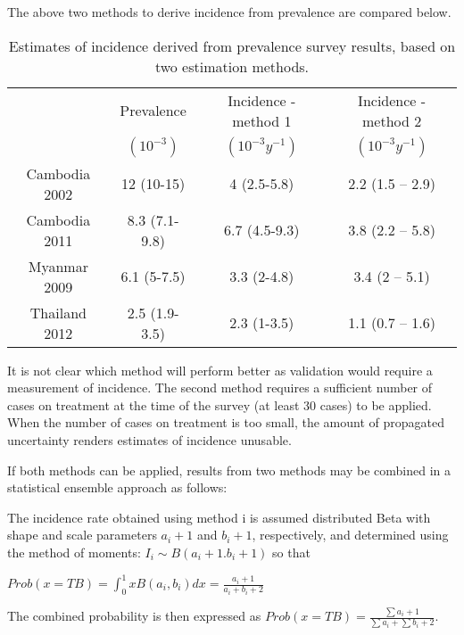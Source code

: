 The above two methods to derive incidence from prevalence are compared below.

\begin{table} 
    \begin{tabular}{ c c c c }
    \hline
         & Prevalence & Incidence - method 1 & Incidence - method 2 \\ 
         & $(10^{-3})$  & $(10^{-3} y^{-1})$     & $(10^{-3} y^{-1})$ \\
    \hline
        Cambodia 2002 & 12 (10-15) & 4 (2.5-5.8) & 2.2 (1.5 – 2.9) \\ 
        Cambodia 2011 & 8.3 (7.1-9.8) & 6.7 (4.5-9.3) & 3.8 (2.2 – 5.8) \\ 
        Myanmar 2009 & 6.1 (5-7.5) & 3.3 (2-4.8) & 3.4 (2 – 5.1) \\ 
        Thailand 2012 & 2.5 (1.9-3.5) & 2.3 (1-3.5) & 1.1 (0.7 – 1.6) \\ 
    \hline
    \end{tabular} 
    \caption{Estimates of incidence derived from prevalence survey results, based on two estimation methods.} 
\end{table}

It is not clear which method will perform better as validation would require a measurement of incidence. The second method requires a sufficient number of cases on treatment at the time of the survey (at least 30 cases) to be applied. When the number of cases on treatment is too small, the amount of propagated uncertainty renders estimates of incidence unusable. 

If both methods can be applied, results from two methods may be combined in a statistical ensemble approach as follows:

The incidence rate obtained using method i is assumed distributed Beta with shape and scale parameters $a_i + 1$ and $b_i + 1$, respectively, and determined using the method of moments: $I_i \sim B(a_i + 1. b_i + 1)$ so that 

$Prob(x=TB)= \int_{0}^{1} x B(a_i,b_i) dx = \frac{a_i+1}{a_i+b_i+2}$

The combined probability is then expressed as 
$Prob(x=TB) = \frac{\sum{a_i}+1}{\sum{a_i}+\sum{b_i}+2}$. 




